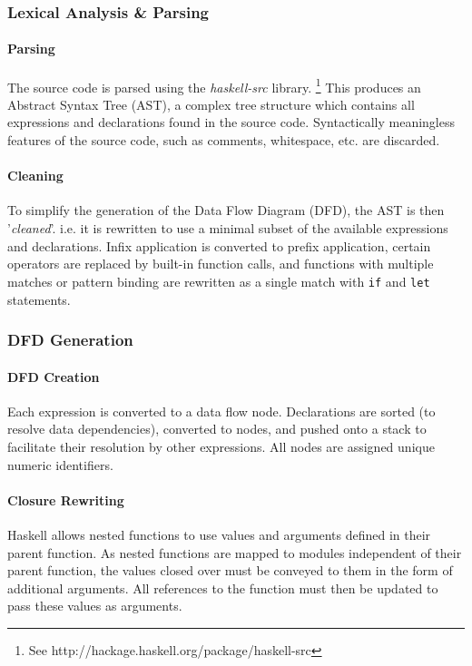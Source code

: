 \documentclass[english,onecolumn]{article}
\begin{document}
\subsubsection{Lexical Analysis \& Parsing}
\paragraph{Parsing}
The source code is parsed using the \textit{haskell-src} library.%
\footnote{See http://hackage.haskell.org/package/haskell-src}
This produces an Abstract Syntax Tree (AST), a complex tree structure which contains all expressions and declarations found in the source code. Syntactically meaningless features of the source code, such as comments, whitespace, etc. are discarded.

\paragraph{Cleaning}
To simplify the generation of the Data Flow Diagram (DFD), the AST is then '\textit{cleaned}'. i.e. it is rewritten to use a minimal subset of the available expressions and declarations. Infix application is converted to prefix application, certain operators are replaced by built-in function calls, and functions with multiple matches or pattern binding are rewritten as a single match with \lstinline{if} and \lstinline{let} statements.

\subsubsection{DFD Generation}
\paragraph{DFD Creation}
Each expression is converted to a data flow node. Declarations are sorted (to resolve data dependencies), converted to nodes, and pushed onto a stack to facilitate their resolution by other expressions. All nodes are assigned unique numeric identifiers.

\paragraph{Closure Rewriting}
Haskell allows nested functions to use values and arguments defined in their parent function. As nested functions are mapped to modules independent of their parent function, the values closed over must be conveyed to them in the form of additional arguments.
All references to the function must then be updated to pass these values as arguments.
\end{document}
